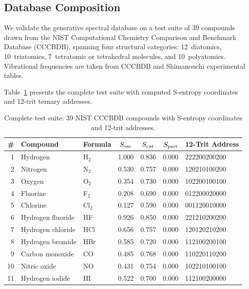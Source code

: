 \subsection{Database Composition}
\label{sec:ch23-db-comp}

We validate the generative spectral database on a test suite of 39 compounds
drawn from the NIST Computational Chemistry Comparison and Benchmark Database
(CCCBDB), spanning four structural categories: 12~diatomics, 10~triatomics,
7~tetratomic or tetrahedral molecules, and 10~polyatomics.  Vibrational
frequencies are taken from CCCBDB and Shimanouchi experimental tables.

Table~\ref{tab:ch23-suite} presents the complete test suite with computed
S-entropy coordinates and 12-trit ternary addresses.

\begin{table}[htbp]
\centering
\small
\caption{Complete test suite: 39 NIST CCCBDB compounds with S-entropy coordinates and 12-trit addresses.}
\label{tab:ch23-suite}
\begin{tabular}{@{}rllcccl@{}}
\toprule
\# & \textbf{Compound} & \textbf{Formula} & $S_{\mathrm{osc}}$ & $S_{\mathrm{cat}}$ & $S_{\mathrm{part}}$ & \textbf{12-Trit Address} \\
\midrule
1  & Hydrogen          & H$_2$                  & 1.000 & 0.836 & 0.000 & 222200200200 \\
2  & Nitrogen          & N$_2$                  & 0.530 & 0.757 & 0.000 & 120210100200 \\
3  & Oxygen            & O$_2$                  & 0.354 & 0.730 & 0.000 & 102200100100 \\
4  & Fluorine          & F$_2$                  & 0.208 & 0.690 & 0.000 & 012200020000 \\
5  & Chlorine          & Cl$_2$                 & 0.127 & 0.590 & 0.000 & 001120010000 \\
6  & Hydrogen fluoride & HF                     & 0.926 & 0.850 & 0.000 & 221210200200 \\
7  & Hydrogen chloride & HCl                    & 0.656 & 0.757 & 0.000 & 120120210200 \\
8  & Hydrogen bromide  & HBr                    & 0.585 & 0.720 & 0.000 & 112100200100 \\
9  & Carbon monoxide   & CO                     & 0.485 & 0.768 & 0.000 & 110220110200 \\
10 & Nitric oxide      & NO                     & 0.431 & 0.754 & 0.000 & 102210100100 \\
11 & Hydrogen iodide   & HI                     & 0.522 & 0.700 & 0.000 & 112100200000 \\

\end{tabular}
\end{table}
